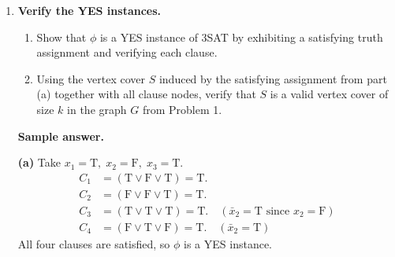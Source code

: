 \documentclass[11pt]{article}
\begin{document}
\begin{enumerate}[leftmargin=0pt, itemindent=1.7em, itemsep=1.2em]
\begin{center}
\end{center}
\fi
\newpage
\item \textbf{Verify the YES instances.}

\begin{enumerate}[label=(\alph*)]
  \item Show that $\phi$ is a YES instance of 3SAT by exhibiting a satisfying truth assignment and verifying each clause.
  \item Using the vertex cover $S$ induced by the satisfying assignment from part (a) together with all clause nodes, verify that $S$ is a valid vertex cover of size $k$ in the graph $G$ from Problem 1.
\end{enumerate}

\vspace{5.5cm}

\ifanswers
\textbf{Sample answer.}

\medskip
\noindent
\textbf{(a)} Take $x_1 = \mathrm{T},\; x_2 = \mathrm{F},\; x_3 = \mathrm{T}$.
\begin{align*}
  C_1 &= (\mathrm{T} \vee \mathrm{F} \vee \mathrm{T}) = \mathrm{T}. \\
  C_2 &= (\mathrm{F} \vee \mathrm{F} \vee \mathrm{T}) = \mathrm{T}. \\
  C_3 &= (\mathrm{T} \vee \mathrm{T} \vee \mathrm{T}) = \mathrm{T}. \quad (\bar x_2 = \mathrm{T} \text{ since } x_2=\mathrm{F})\\
  C_4 &= (\mathrm{F} \vee \mathrm{T} \vee \mathrm{F}) = \mathrm{T}. \quad (\bar x_2 = \mathrm{T})
\end{align*}
All four clauses are satisfied, so $\phi$ is a YES instance.


\end{enumerate}
\end{document}
